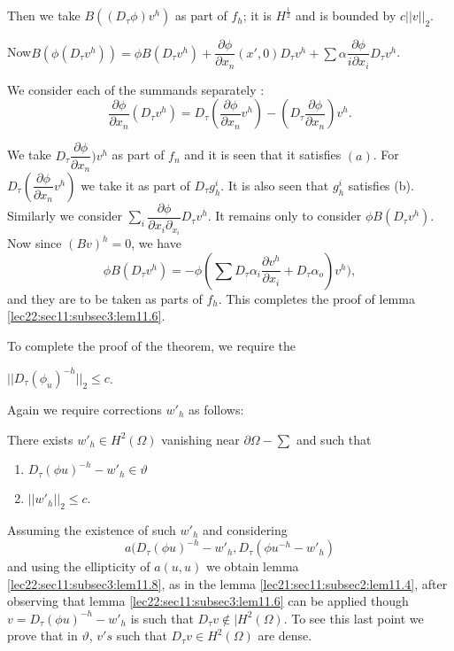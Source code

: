 Then we take $B((D_\tau \phi )v^h)$ as part of $f_h$; it is
$H^{\frac{1}{2}}$ and is bounded by $c || v ||_2$.  

Now\pageoriginale \quad $B(\phi (D_\tau v^h)) = \phi B(D_\tau v^h) + \dfrac{\partial
  \phi}{\partial x_n} (x', 0) D_\tau v^h + \sum \alpha \dfrac{\partial
  \phi}{i \partial x_i} D_\tau v^h$.  

We consider each of the summands separately :
$$
\frac {\partial \phi}{\partial x_n} (D_\tau v^h) = D_\tau
\left(\frac{\partial \phi}{\partial x_n} v^h\right) - \left(D_\tau \frac{\partial
  \phi}{\partial x_n}\right) v^h.  
$$

We take $D_\tau \dfrac{\partial \phi}{\partial x_n}) v^h$ as part of
$f_n$ and it is seen that it satisfies $(a)$. For $D_\tau
\left(\dfrac{\partial \phi}{\partial x_n} v^h\right)$ we take it as part of
$D_\tau g^i_h$. It is also seen that $g^i_h$ satisfies
(b). Similarly we consider $\displaystyle{\sum_i} \dfrac{\partial \phi}{\partial x_i \partial_{x_i}} D_\tau v^h$. It remains only to consider $\phi B (D_\tau 
v^h)$. Now since $(Bv)^h = 0$, we have  
$$
\phi B(D_\tau v^h ) = - \phi \left(\sum D_\tau \alpha_i \frac{\partial
  v^h}{\partial x_i}+ D_\tau \alpha_o \right) v^h),  
$$
and they are to be taken as parts of $f_h$. This completes the proof
of lemma \ref{lec22:sec11:subsec3:lem11.6}.  

To complete the proof of the theorem, we require the
\begin{lemma}\label{lec22:sec11:subsec3:lem11.8} %
  $|| D_\tau (\phi_u)^{-h} ||_2 \leq c$. 
\end{lemma}

Again we require corrections $w'_h$ as follows:
\begin{lemma}\label{lec22:sec11:subsec3:lem11.9} %
  There exists $w'_h \in H^2 (\Omega)$ vanishing near $\partial
  \Omega - \sum$ and such that 
  \begin{enumerate}[(1)]
  \item $D_\tau (\phi u)^{-h} - w'_h \in \vartheta$
  \item $|| w'_h ||_2 \leq c$. 
  \end{enumerate}
\end{lemma}

Assuming the existence of such $w'_h$ and considering
$$
a(D_\tau (\phi u)^{-h} - w'_h, D_\tau (\phi u^{-h} - w'_h)
$$
and using the ellipticity of $a(u, u)$ we obtain lemma \ref{lec22:sec11:subsec3:lem11.8}, as in
the lemma \ref{lec21:sec11:subsec2:lem11.4}, after observing that lemma \ref{lec22:sec11:subsec3:lem11.6} can be applied
though $v = D_\tau (\phi u)^{-h} - w'_h$ is such that $D_\tau v
\notin | H^2 (\Omega)$. To see this last point we prove that in
$\vartheta$, $v's$ such that $D_\tau v \in H^2 (\Omega)$ are
dense.  

